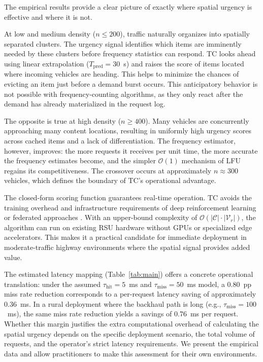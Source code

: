 \documentclass[preprint,12pt]{elsarticle}
\begin{document}
	\label{sec:discussion}
	
	The empirical results provide a clear picture of exactly where spatial urgency is effective and where it is not. 
	
	At low and medium density ($n \leq 200$), traffic naturally organizes into spatially separated clusters. The urgency signal identifies which items are imminently needed by these clusters before frequency statistics can respond. TC looks ahead using linear extrapolation ($T_\text{pred} = 30$~s) and raises the score of items located where incoming vehicles are heading. This helps to minimize the chances of evicting an item just before a demand burst occurs. This anticipatory behavior is not possible with frequency-counting algorithms, as they only react after the demand has already materialized in the request log.
	
	The opposite is true at high density ($n \geq 400$). Many vehicles are concurrently approaching many content locations, resulting in uniformly high urgency scores across cached items and a lack of differentiation. The frequency estimator, however, improves: the more requests it receives per unit time, the more accurate the frequency estimates become, and the simpler $\mathcal{O}(1)$ mechanism of LFU regains its competitiveness. The crossover occurs at approximately $n \approx 300$ vehicles, which defines the boundary of TC's operational advantage.
	
	The closed-form scoring function guarantees real-time operation. TC avoids the training overhead and infrastructure requirements of deep reinforcement learning or federated approaches \cite{he2018mobility}. With an upper-bound complexity of $\mathcal{O}(|\mathcal{C}| \cdot |\mathcal{V}_r|)$, the algorithm can run on existing RSU hardware without GPUs or specialized edge accelerators. This makes it a practical candidate for immediate deployment in moderate-traffic highway environments where the spatial signal provides added value.
	
	The estimated latency mapping (Table~\ref{tab:main}) offers a concrete operational translation: under the assumed $\tau_\text{hit} = 5$~ms and $\tau_\text{miss} = 50$~ms model, a 0.80~pp miss rate reduction corresponds to a per-request latency saving of approximately 0.36~ms. In a rural deployment where the backhaul path is long (e.g., $\tau_\text{miss} = 100$~ms), the same miss rate reduction yields a savings of 0.76~ms per request. Whether this margin justifies the extra computational overhead of calculating the spatial urgency depends on the specific deployment scenario, the total volume of requests, and the operator's strict latency requirements. We present the empirical data and allow practitioners to make this assessment for their own environments.
\end{document}
